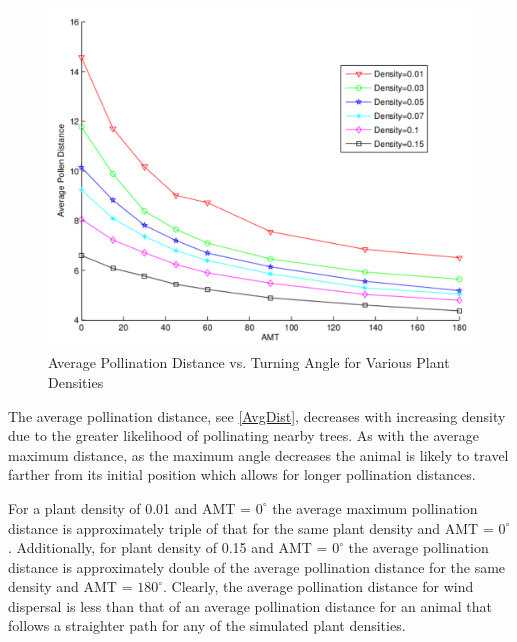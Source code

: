 \begin{figure}
  \begin{center}
  \includegraphics[scale=0.5]{PollenDVsAMT.pdf}
  \end{center}
  \caption{\small Average Pollination Distance vs. Turning Angle for Various Plant Densities}
  \label{AvgDist}
\end{figure}

The average pollination distance, see \autoref{AvgDist}, decreases with
increasing density due to the greater likelihood of pollinating nearby trees.
As with the average maximum distance, as the maximum angle decreases the animal
is likely to travel farther from its initial position which allows for longer
pollination distances.

For a plant density of 0.01 and AMT = $0^\circ$ the average maximum pollination
distance is approximately triple of that for the same plant density and AMT =
$0^\circ$. Additionally, for plant density of 0.15 and AMT = $0^\circ$ the
average pollination distance is approximately double of the average pollination
distance for the same density and AMT = $180^\circ$. Clearly, the average
pollination distance for wind dispersal is less than that of an average
pollination distance for an animal that follows a straighter path for any of the
simulated plant densities.

